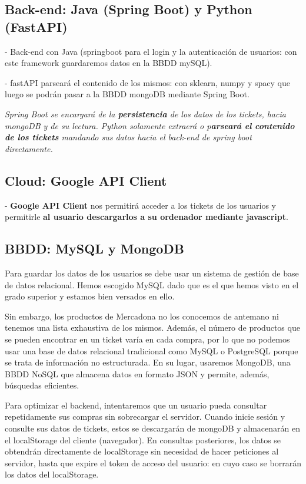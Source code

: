 \documentclass[a4paper,12pt]{report}
\begin{document}
	
		 
		\subsection{Back-end: Java (Spring Boot) y Python (FastAPI)}
		
			- Back-end con Java (springboot para el login y la autenticación de usuarios: con este framework guardaremos datos en la BBDD mySQL).
			
			- fastAPI parseará el contenido de los mismos: con sklearn, numpy y spacy que luego se podrán pasar a la BBDD mongoDB mediante Spring Boot.
			
			
		\textit{	Spring Boot se encargará de la \textbf{persistencia} de los datos de los tickets, hacia mongoDB y de su lectura. Python solamente extraerá o p\textbf{arseará el contenido de los tickets} mandando sus datos hacia el back-end de spring boot directamente.}
		
		\subsection{Cloud: Google API Client}
		
					-\textbf{ Google API Client} nos permitirá acceder a los tickets de los usuarios y permitirle \textbf{al usuario descargarlos a su ordenador mediante javascript}.
			
		\subsection{BBDD: MySQL y MongoDB}
		
		
		Para guardar los datos de los usuarios se debe usar un sistema de gestión de base de datos relacional. Hemos escogido MySQL dado que es el que hemos visto en el grado superior y estamos bien versados en ello.
		
		Sin embargo, los productos de Mercadona no los conocemos de antemano ni tenemos una lista exhaustiva de los mismos. Además, el número de productos que se pueden encontrar en un ticket varía en cada compra, por lo que no podemos usar una base de datos relacional tradicional como MySQL o PostgreSQL porque se trata de información no estructurada. En su lugar, usaremos MongoDB, una BBDD NoSQL que almacena datos en formato JSON y permite, además, búsquedas eficientes.
		
		Para optimizar el backend, intentaremos que un usuario pueda consultar repetidamente sus compras sin sobrecargar el servidor. Cuando inicie sesión y consulte sus datos de tickets, estos se descargarán de mongoDB y almacenarán en el localStorage del cliente (navegador). En consultas posteriores, los datos se obtendrán directamente de localStorage sin necesidad de hacer peticiones al servidor, hasta que expire el token de acceso del usuario: en cuyo caso se borrarán los datos del localStorage.
		
\end{document}
